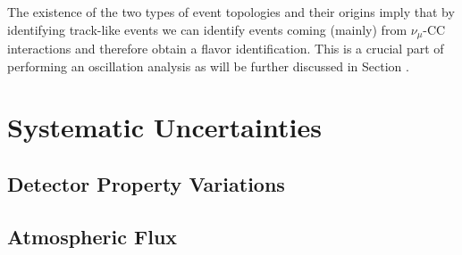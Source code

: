
The existence of the two types of event topologies and their origins imply that by identifying track-like events we can identify events coming (mainly) from $\nu_\mu$-CC interactions and therefore obtain a flavor identification.
This is a crucial part of performing an oscillation analysis as will be further discussed in Section .



\section{Systematic Uncertainties}

\subsection{Detector Property Variations}

\subsection{Atmospheric Flux}
